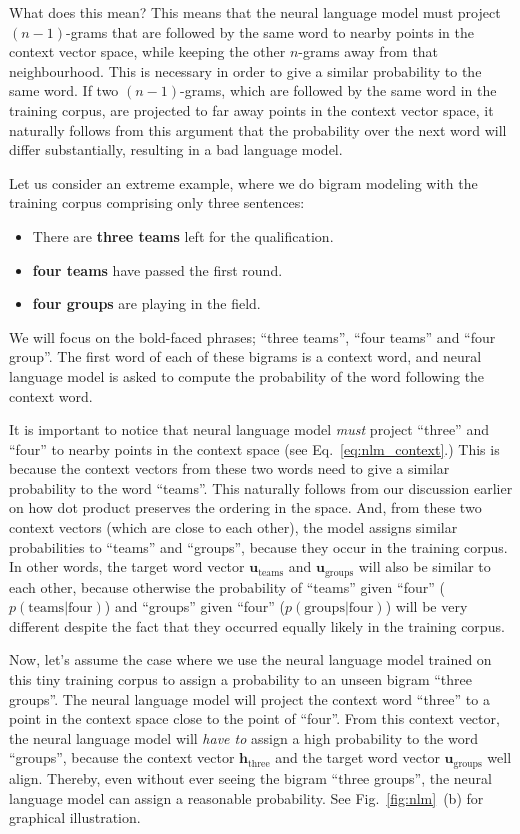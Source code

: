 \documentclass{report}
\newcommand{\vect}[1]{\mathbf{#1}}
\newcommand{\vh}[0]{\vect{h}}
\newcommand{\vu}[0]{\vect{u}}
\begin{document}
What does this mean? This means that the neural language model must project
$(n-1)$-grams that are followed by the same word to nearby points in the context
vector space, while keeping the other $n$-grams away from that neighbourhood.
This is necessary in order to give a similar probability to the same word. If
two $(n-1)$-grams, which are followed by the same word in the training corpus,
are projected to far away points in the context vector space, it naturally
follows from this argument that the probability over the next word will differ
substantially, resulting in a bad language model.

Let us consider an extreme example, where we do bigram modeling with the
training corpus comprising only three sentences:
\begin{itemize}
    \itemsep 0em
    \item There are {\bf three teams} left for the qualification.
    \item {\bf four teams} have passed the first round.
    \item {\bf four groups} are playing in the field.
\end{itemize}
We will focus on the bold-faced phrases; ``three teams'', ``four teams'' and
``four group''. The first word of each of these bigrams is a context word, and
neural language model is asked to compute the probability of the word following
the context word.

It is important to notice that neural language model {\em must} project
``three'' and ``four'' to nearby points in the context space (see
Eq.~\eqref{eq:nlm_context}.) This is because the context vectors from these two
words need to give a similar probability to the word ``teams''. This naturally
follows from our discussion earlier on how dot product preserves the ordering in
the space. And, from these two context vectors (which are close to each other),
the model assigns similar probabilities to ``teams'' and ``groups'', because
they occur in the training corpus. In other words, the target word vector
$\vu_{\text{teams}}$ and $\vu_{\text{groups}}$ will also be similar to each
other, because otherwise the probability of ``teams'' given ``four''
($p(\text{teams} | \text{four})$) and
``groups'' given ``four'' ($p(\text{groups} | \text{four})$) will be very
different despite the fact that they occurred equally likely in the training
corpus.

Now, let's assume the case where we use the neural language model trained on
this tiny training corpus to assign a probability to an unseen bigram ``three
groups''. The neural language model will project the context word ``three'' to a
point in the context space close to the point of ``four''. From this context
vector, the neural language model will {\em have to} assign a high probability
to the word ``groups'', because the context vector $\vh_{\text{three}}$ and the
target word vector $\vu_{\text{groups}}$ well align. Thereby, even without ever
seeing the bigram ``three groups'', the neural language model can assign a
reasonable probability. See Fig.~\ref{fig:nlm}~(b) for graphical
illustration.
\end{document}
